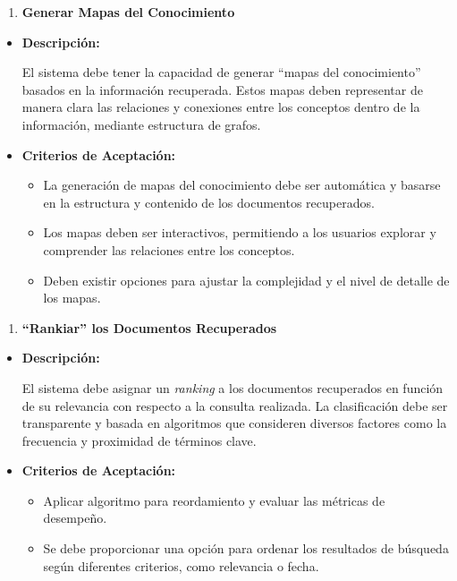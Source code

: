 \documentclass[
  12pt,
  openany]{book}
\providecommand{\tightlist}{%
  \setlength{\itemsep}{0pt}\setlength{\parskip}{0pt}}
\begin{document}
\begin{enumerate}
\def\labelenumi{\arabic{enumi}.}
\setcounter{enumi}{3}
\tightlist
\item
  \textbf{Generar Mapas del Conocimiento}
\end{enumerate}

\begin{itemize}
\item
  \textbf{Descripción:}

  El sistema debe tener la capacidad de generar ``mapas del conocimiento'' basados en la información recuperada. Estos mapas deben representar de manera clara las relaciones y conexiones entre los conceptos dentro de la información, mediante estructura de grafos.
\item
  \textbf{Criterios de Aceptación:}

  \begin{itemize}
  \item
    La generación de mapas del conocimiento debe ser automática y basarse en la estructura y contenido de los documentos recuperados.
  \item
    Los mapas deben ser interactivos, permitiendo a los usuarios explorar y comprender las relaciones entre los conceptos.
  \item
    Deben existir opciones para ajustar la complejidad y el nivel de detalle de los mapas.
  \end{itemize}
\end{itemize}

\begin{enumerate}
\def\labelenumi{\arabic{enumi}.}
\setcounter{enumi}{4}
\tightlist
\item
  \textbf{``Rankiar'' los Documentos Recuperados}
\end{enumerate}

\begin{itemize}
\item
  \textbf{Descripción:}

  El sistema debe asignar un \emph{ranking} a los documentos recuperados en función de su relevancia con respecto a la consulta realizada. La clasificación debe ser transparente y basada en algoritmos que consideren diversos factores como la frecuencia y proximidad de términos clave.
\item
  \textbf{Criterios de Aceptación:}

  \begin{itemize}
  \item
    Aplicar algoritmo para reordamiento y evaluar las métricas de desempeño.
  \item
    Se debe proporcionar una opción para ordenar los resultados de búsqueda según diferentes criterios, como relevancia o fecha.
  \end{itemize}
\end{itemize}
\end{document}
